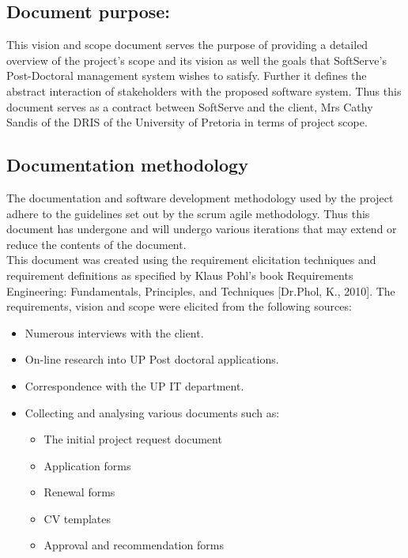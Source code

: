 \documentclass[12pt]{article}
\begin{document}
\subsection{Document purpose:}
\vspace{0.2in}
This vision and scope document serves the purpose of providing a detailed overview of the project's scope and its vision as well the goals that SoftServe's Post-Doctoral management system wishes to satisfy. Further it defines the abstract interaction of stakeholders with the proposed software system. Thus this document serves as a contract between SoftServe and the client, Mrs Cathy Sandis of the DRIS of the University of Pretoria in terms of project scope.

\vspace{0.2in}

\subsection{Documentation methodology}
\vspace{0.2in}
\begin{flushleft}
The documentation and software development methodology used by the project adhere to the guidelines set out by the scrum agile methodology. Thus this document has undergone and will undergo various iterations that may extend or reduce the contents of the document.\\

This document was created using the requirement elicitation techniques and requirement definitions as specified by Klaus Pohl’s book Requirements Engineering: Fundamentals, Principles, and Techniques [Dr.Phol, K., 2010].
The requirements, vision and scope were elicited from the following sources:
\begin{itemize}
	\item Numerous interviews with the client.
	\item On-line research into UP Post doctoral applications.
	\item Correspondence with the UP IT department.
	\item Collecting and analysing various documents such as:
		\begin{itemize}
			\item The initial project request document
			\item Application forms
			\item Renewal forms
			\item CV templates
			\item Approval and recommendation forms
		\end{itemize}
\end{itemize}
\end{flushleft}	
\end{document}

